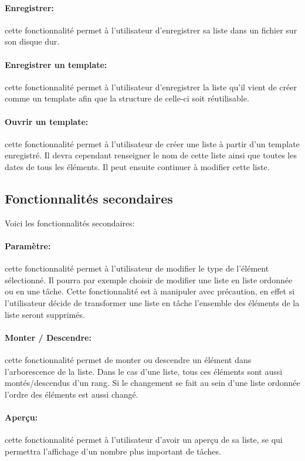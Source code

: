 \documentclass[a4paper,10pt]{article}
\begin{document}
\paragraph{Enregistrer:} cette fonctionnalité permet à l'utilisateur d'enregistrer sa liste dans un fichier sur son disque dur.
\paragraph{Enregistrer un template:} cette fonctionnalité permet à l'utilisateur d'enregistrer la liste qu'il vient de créer comme un template afin que la
structure de celle-ci soit réutilisable.
\paragraph{Ouvrir un template:} cette fonctionnalité permet à l'utilisateur de créer une liste à partir d'un template enregistré. Il devra cependant renseigner
le nom de cette liste ainsi que toutes les dates de tous les éléments. Il peut ensuite continuer à modifier cette liste.

\subsection{Fonctionnalités secondaires}
Voici les fonctionnalités secondaires:
\paragraph{Paramètre:} cette fonctionnalité permet à l'utilisateur de modifier le type de l'élément sélectionné. Il pourra par exemple choisir de modifier une
liste en liste ordonnée ou en une tâche. Cette fonctionnalité est à manipuler avec précaution, en effet si l'utilisateur décide de transformer une liste en
tâche l'ensemble des éléments de la liste seront supprimés.
\paragraph{Monter / Descendre:} cette fonctionnalité permet de monter ou descendre un élément dans l'arborescence de la liste. Dans le cas d'une liste, tous
ces éléments sont aussi montés/descendus d'un rang. Si le changement se fait au sein d'une liste ordonnée l'ordre des éléments est aussi changé.
\paragraph{Aperçu:} cette fonctionnalité permet à l'utilisateur d'avoir un aperçu de sa liste, se qui permettra l'affichage d'un nombre plus important de
tâches.
\end{document}
